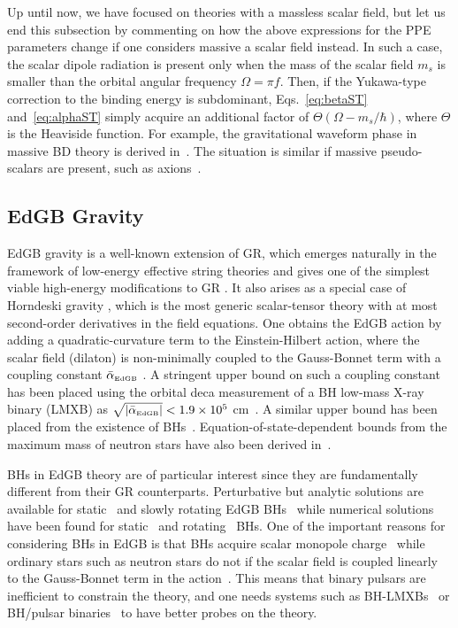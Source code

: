 \documentclass[prd,twocolumn,nofootinbib]{revtex4-1}
\newcommand{\EDGB}{{\mbox{\tiny EdGB}}}
\begin{document}
Up until now, we have focused on theories with a massless scalar field, but let us end this subsection by commenting on how the above expressions for the PPE parameters change if one considers massive a scalar field instead. In such a case, the scalar dipole radiation is present only when the mass of the scalar field $m_s$ is smaller than the orbital angular frequency $\Omega= \pi f$. Then, if the Yukawa-type correction to the binding energy is subdominant, Eqs.~\eqref{eq:betaST} and~\eqref{eq:alphaST} simply acquire an additional factor of $\Theta(\Omega - m_s/\hbar)$, where $\Theta$ is the Heaviside function. For example, the gravitational waveform phase in massive BD theory is derived in~\cite{Berti:2012bp}. The situation is similar if massive pseudo-scalars are present, such as axions~\cite{Huang:2018pbu}.

 
  \subsection{EdGB Gravity}
EdGB gravity is a well-known extension of GR, which emerges naturally in the framework of low-energy effective string theories  and gives one of the simplest viable high-energy modifications to GR \cite{Moura:2006pz,Pani:2009wy}. It also arises as a special case of Horndeski gravity \cite{Zhang:2017unx,Berti:2015itd}, which is the most generic scalar-tensor theory with at most second-order derivatives in the field equations. One obtains the EdGB action by adding a quadratic-curvature term to the Einstein-Hilbert action, where the scalar field (dilaton) is non-minimally coupled to the Gauss-Bonnet term with a coupling constant $\bar{\alpha}_\EDGB$ \cite{Kanti:1995vq}. A stringent upper bound on such a coupling constant has been placed using the orbital deca measurement of a BH low-mass X-ray binary (LMXB) as $\sqrt{|\bar{\alpha}_\EDGB|} < 1.9\times10^5$ cm~\cite{Yagi:2012gp}. A similar upper bound has been placed from the existence of BHs~\cite{Pani:2009wy}. Equation-of-state-dependent bounds from the maximum mass of neutron stars have also been derived in~\cite{pani-EDGB-NS}. 


BHs in EdGB theory are of particular interest since they are fundamentally different from their GR counterparts. Perturbative but analytic solutions are available for static~\cite{Mignemi:1992nt,Mignemi:1993ce,Yunes:2011we,Sotiriou:2014pfa} and slowly rotating EdGB BHs~\cite{Pani:2011gy,Ayzenberg:2014aka,Maselli:2015tta} while numerical solutions have been found for static~\cite{Kanti:1995vq,Torii:1996yi,Alexeev:1996vs} and rotating~\cite{Pani:2009wy,Kleihaus:2011tg,Kleihaus:2014lba} BHs. One of the important reasons for considering BHs in EdGB is that BHs acquire scalar monopole charge~\cite{Yagi:2011xp,Sotiriou:2014pfa,Berti:2018cxi,Prabhu:2018aun} while ordinary stars such as neutron stars do not if the scalar field is coupled linearly to the Gauss-Bonnet term in the action~\cite{Yagi:2011xp,Yagi:2015oca}. This means that binary pulsars are inefficient to constrain the theory, and one needs systems such as BH-LMXBs~\cite{Yagi:2012gp} or BH/pulsar binaries~\cite{Yagi:2015oca} to have better probes on the theory.
\end{document}
